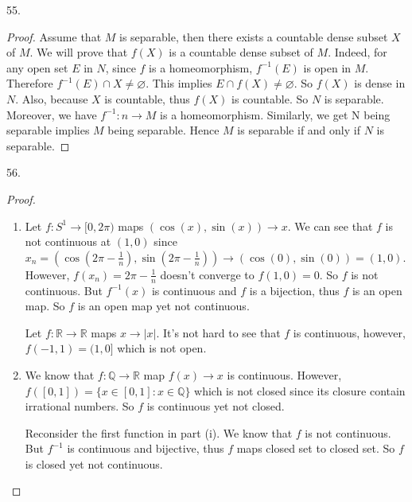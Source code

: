 \documentclass[12pt, a4paper]{article}
\theoremstyle{plain}
\newcommand{\Q}{\mathbb{Q}}
\newcommand{\R}{\mathbb{R}}
\begin{document}
55. 
\begin{proof}
Assume that $M$ is separable, then there exists a countable dense subset $X$ of $M$. We will prove that $f(X)$ is a countable dense subset of $M$. Indeed, for any open set $E$ in $N$, since $f$ is a homeomorphism, $f^{-1}(E)$ is open in $M$. Therefore $f^{-1}(E)\cap X\neq \varnothing$. This implies $E\cap f(X)\neq \varnothing$. So $f(X)$ is dense in $N$. Also, because $X$ is countable, thus $f(X)$ is countable. So $N$ is separable. Moreover, we have $f^{-1}:n\rightarrow M$ is a homeomorphism. Similarly, we get N being separable implies $M$ being separable. Hence $M$ is separable if and only if $N$ is separable.
\end{proof}

\pagebreak

56.
\begin{proof}
\hfill
\begin{enumerate}[label=(\roman*)]
\item Let $f:S^1\rightarrow [0,2\pi)$ maps $(\cos(x),\sin(x))\rightarrow x$. We can see that $f$ is not continuous at $(1,0)$ since $x_n=(\cos(2\pi-\frac{1}{n}),\sin(2\pi-\frac{1}{n}))\rightarrow (\cos(0),\sin(0))=(1,0)$. However, $f(x_n)=2\pi-\frac{1}{n}$ doesn't converge to $f(1,0)=0$. So $f$ is not continuous. But $f^{-1}(x)$ is continuous and $f$ is a bijection, thus $f$ is an open map. So $f$ is an open map yet not continuous.

Let $f:\R\rightarrow \R$ maps $x\rightarrow |x|$. It's not hard to see that $f$ is continuous, however, $f(-1,1)=(1,0]$ which is not open.

\item We know that $f:\Q\rightarrow\R$ map $f(x)\rightarrow x$ is continuous. However, $f([0,1])=\{x\in[0,1]: x\in\Q\}$ which is not closed since its closure contain irrational numbers. So $f$ is continuous yet not closed.

Reconsider the first function in part (i). We know that $f$ is not continuous. But $f^{-1}$ is continuous and bijective, thus $f$ maps closed set to closed set. So $f$ is closed yet not continuous.
\end{enumerate}
\end{proof}
\end{document}

